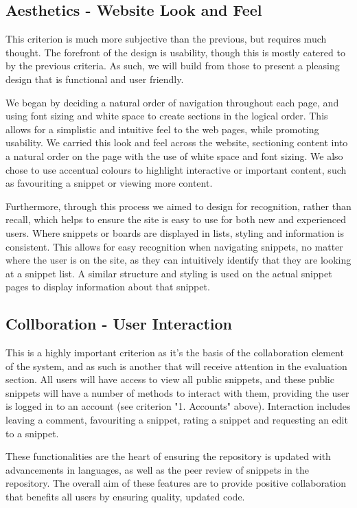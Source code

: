 \subsection{Aesthetics - Website Look and Feel}

This criterion is much more subjective than the previous, but requires much thought.
The forefront of the design is usability, though this is mostly catered to by the previous criteria. 
As such, we will build from those to present a pleasing design that is functional and user friendly. 

We began by deciding a natural order of navigation throughout each page, and using font sizing and white space to create sections in the logical order. 
This allows for a simplistic and intuitive feel to the web pages, while promoting usability. 
We carried this look and feel across the website, sectioning content into a natural order on the page with the use of white space and font sizing. 
We also chose to use accentual colours to highlight interactive or important content, such as favouriting a snippet or viewing more content.

Furthermore, through this process we aimed to design for recognition, rather than recall, which helps to ensure the site is easy to use for both new and experienced users.
Where snippets or boards are displayed in lists, styling and information is consistent.
This allows for easy recognition when navigating snippets, no matter where the user is on the site, as they can intuitively  identify that they are looking at a snippet list.
A similar structure and styling is used on the actual snippet pages to display information about that snippet. 

\subsection{Collboration - User Interaction}

This is a highly important criterion as it's the basis of the collaboration element of the system, and as such is another that will receive attention in the evaluation section. 
All users will have access to view all public snippets, and these public snippets will have a number of methods to interact with them, providing the user is logged in to an account (see criterion "1. Accounts" above).
Interaction includes leaving a comment, favouriting a snippet, rating a snippet and requesting an edit to a snippet. 

These functionalities are the heart of ensuring the repository is updated with advancements in languages, as well as the peer review of snippets in the repository.
The overall aim of these features are to provide positive collaboration that benefits all users by ensuring quality, updated code.

